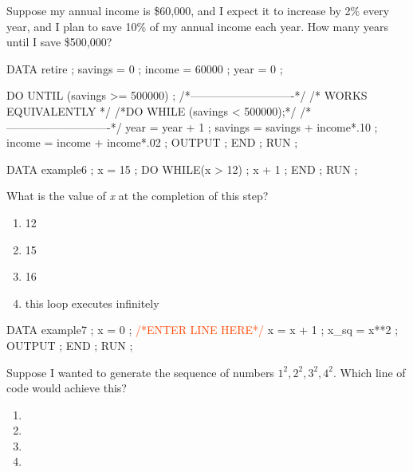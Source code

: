 \begin{frame}[fragile]
\hspace*{-0.2in}
Suppose my annual income is \$60,000, and I expect it to increase by 2\% every year, and I plan to save 10\% of my annual income each year.  How many years until I save \$500,000?
\emp
{}
\hspace*{0.05in}
\emp
{}
\footnotesize
\begin{code}{.0}
DATA retire ;
	savings = 0 ;
	income = 60000 ;
	year = 0 ;

	DO UNTIL (savings >= 500000) ;
    /*----------------------------*/
    /*    WORKS EQUIVALENTLY      */
    /*DO WHILE (savings < 500000);*/
    /*----------------------------*/
		year = year + 1 ;
		savings = savings + income*.10 ;
		income = income + income*.02 ;
		OUTPUT ;
	END ;
RUN ;
\end{code}
\emp
\end{frame}


\begin{frame}[fragile]
\fto
{}
\footnotesize
\begin{code}{.0}
DATA example6 ;
   x = 15 ;
   DO WHILE(x > 12) ;
      x + 1 ;
   END ;
RUN ;
\end{code}
\emp
{}
\hspace*{0.05in}
\emp
{}
\begin{clicker}{What is the value of \emph{x} at the completion of this  step?}
\begin{enumerate}
    \item 12
    \item 15
    \item 16
    \item this loop executes infinitely %
\end{enumerate}
\end{clicker}
\emp
\end{frame}

\begin{frame}[fragile]
\fto
{}
\footnotesize
\begin{code}{.0}
DATA example7 ;
   x = 0 ;
   \textcolor{OrangeRed}{/*ENTER LINE HERE*/}
      x = x + 1 ;
      x_sq = x**2 ;
      OUTPUT ;
   END ;
RUN ;
\end{code}
\emp
{}
\hspace*{0.05in}
\emp
{}
\begin{clicker}{Suppose I wanted to generate the sequence of numbers $1^2, 2^2, 3^2, 4^2$.  Which line of code would achieve this?}
\begin{enumerate}
\item {}
\item {} %
\item {}
\item {}
\end{enumerate}
\end{clicker}
\emp
\end{frame}

